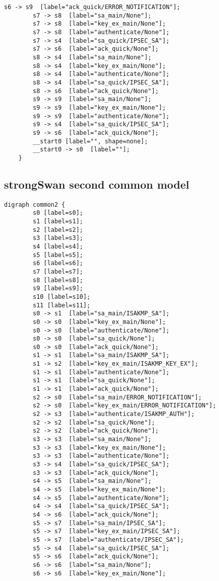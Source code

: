 \begin{appendices}
\begin{lstlisting}[numbers=none]
		s6 -> s9  [label="ack_quick/ERROR_NOTIFICATION"];
		s7 -> s8  [label="sa_main/None"];
		s7 -> s8  [label="key_ex_main/None"];
		s7 -> s8  [label="authenticate/None"];
		s7 -> s4  [label="sa_quick/IPSEC_SA"];
		s7 -> s6  [label="ack_quick/None"];
		s8 -> s4  [label="sa_main/None"];
		s8 -> s4  [label="key_ex_main/None"];
		s8 -> s4  [label="authenticate/None"];
		s8 -> s4  [label="sa_quick/IPSEC_SA"];
		s8 -> s6  [label="ack_quick/None"];
		s9 -> s9  [label="sa_main/None"];
		s9 -> s9  [label="key_ex_main/None"];
		s9 -> s9  [label="authenticate/None"];
		s9 -> s4  [label="sa_quick/IPSEC_SA"];
		s9 -> s6  [label="ack_quick/None"];
		__start0 [label="", shape=none];
		__start0 -> s0  [label=""];
	}
\end{lstlisting}
\newpage

\subsection*{strongSwan second common model}
\begin{lstlisting}[numbers=none]
	digraph common2 {
		s0 [label=s0];
		s1 [label=s1];
		s2 [label=s2];
		s3 [label=s3];
		s4 [label=s4];
		s5 [label=s5];
		s6 [label=s6];
		s7 [label=s7];
		s8 [label=s8];
		s9 [label=s9];
		s10 [label=s10];
		s11 [label=s11];
		s0 -> s1  [label="sa_main/ISAKMP_SA"];
		s0 -> s0  [label="key_ex_main/None"];
		s0 -> s0  [label="authenticate/None"];
		s0 -> s0  [label="sa_quick/None"];
		s0 -> s0  [label="ack_quick/None"];
		s1 -> s1  [label="sa_main/ISAKMP_SA"];
		s1 -> s2  [label="key_ex_main/ISAKMP_KEY_EX"];
		s1 -> s1  [label="authenticate/None"];
		s1 -> s1  [label="sa_quick/None"];
		s1 -> s1  [label="ack_quick/None"];
		s2 -> s0  [label="sa_main/ERROR_NOTIFICATION"];
		s2 -> s0  [label="key_ex_main/ERROR_NOTIFICATION"];
		s2 -> s3  [label="authenticate/ISAKMP_AUTH"];
		s2 -> s2  [label="sa_quick/None"];
		s2 -> s2  [label="ack_quick/None"];
		s3 -> s3  [label="sa_main/None"];
		s3 -> s3  [label="key_ex_main/None"];
		s3 -> s3  [label="authenticate/None"];
		s3 -> s4  [label="sa_quick/IPSEC_SA"];
		s3 -> s3  [label="ack_quick/None"];
		s4 -> s5  [label="sa_main/None"];
		s4 -> s5  [label="key_ex_main/None"];
		s4 -> s5  [label="authenticate/None"];
		s4 -> s4  [label="sa_quick/IPSEC_SA"];
		s4 -> s6  [label="ack_quick/None"];
		s5 -> s7  [label="sa_main/IPSEC_SA"];
		s5 -> s7  [label="key_ex_main/IPSEC_SA"];
		s5 -> s7  [label="authenticate/IPSEC_SA"];
		s5 -> s4  [label="sa_quick/IPSEC_SA"];
		s5 -> s6  [label="ack_quick/None"];
		s6 -> s6  [label="sa_main/None"];
		s6 -> s6  [label="key_ex_main/None"];

\end{lstlisting}
\end{appendices}
